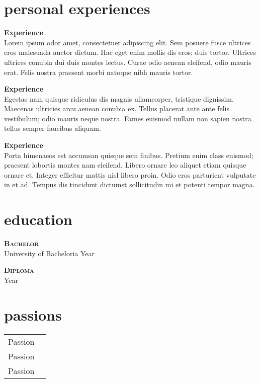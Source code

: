 \documentclass[11pt]{article}
\newcommand{\entrySmall}[4]{
    {\scshape\large\textbf{#1}} \hfill #3 \\
    #2 \hfill #4
}
\newcommand{\jobpoint}[2]{
    {\large\textbf{#1}}\\
    {#2}
}
\begin{document}
\begin{paracol}{2}
    
\section{personal experiences}

\smallskip
    
    \jobpoint{Experience}{Lorem ipsum odor amet, consectetuer adipiscing elit. Sem posuere fusce ultrices eros malesuada auctor dictum. Hac eget enim mollis dis eros; duis tortor. Ultrices ultrices conubia dui duis montes lectus. Curae odio aenean eleifend, odio mauris erat. Felis nostra praesent morbi natoque nibh mauris tortor.}
    
    \medskip
    
    \jobpoint{Experience}{Egestas nam quisque ridiculus dis magnis ullamcorper, tristique dignissim. Maecenas ultricies arcu aenean conubia ex. Tellus placerat ante ante felis vestibulum; odio mauris neque nostra. Fames euismod nullam non sapien nostra tellus semper faucibus aliquam.}

    \medskip
            
    \jobpoint{Experience}{Porta himenaeos est accumsan quisque sem finibus. Pretium enim class euismod; praesent lobortis montes nam eleifend. Libero ornare leo aliquet etiam quisque ornare et. Integer efficitur mattis nisl libero proin. Odio eros parturient vulputate in et ad. Tempus dis tincidunt dictumst sollicitudin mi et potenti tempor magna.}
    
    \switchcolumn

    \section{education}
        \entrySmall{Bachelor}{University of Bacheloria}{}{Year}
        
        
        \smallskip
        
        \entrySmall{Diploma}{\phantom{}}{}{Year}

    \section{passions}
    \begin{supertabular}{ll}
        Passion \\
        Passion \\
        Passion \\
    \end{supertabular}

\switchcolumn*

\end{paracol}
\end{document}
